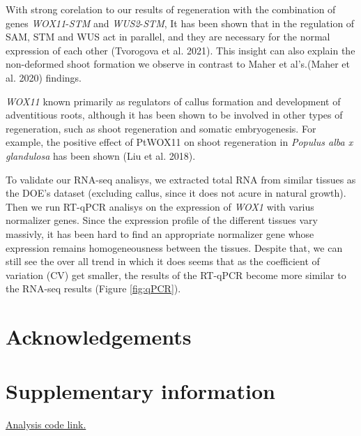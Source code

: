 \documentclass[
]{article}
\begin{document}
With strong corelation to our results of regeneration with the
combination of genes \emph{WOX11}-\emph{STM} and \emph{WUS2}-\emph{STM},
It has been shown that in the regulation of SAM, STM and WUS act in
parallel, and they are necessary for the normal expression of each other
(Tvorogova et al. 2021). This insight can also explain the non-deformed
shoot formation we observe in contrast to Maher et al's.(Maher et al.
2020) findings.

\emph{WOX11} known primarily as regulators of callus formation and
development of adventitious roots, although it has been shown to be
involved in other types of regeneration, such as shoot regeneration and
somatic embryogenesis. For example, the positive effect of PtWOX11 on
shoot regeneration in \emph{Populus alba x glandulosa} has been shown
(Liu et al. 2018).

To validate our RNA-seq analisys, we extracted total RNA from similar
tissues as the DOE's dataset (excluding callus, since it does not acure
in natural growth). Then we run RT-qPCR analisys on the expression of
\emph{WOX1} with varius normalizer genes. Since the expression profile
of the different tissues vary massivly, it has been hard to find an
appropriate normalizer gene whose expression remains homogeneousness
between the tissues. Despite that, we can still see the over all trend
in which it does seems that as the coefficient of variation (CV) get
smaller, the results of the RT-qPCR become more similar to the RNA-seq
results (Figure \ref{fig:qPCR}).

\hypertarget{acknowledgements}{%
\section{Acknowledgements}\label{acknowledgements}}

\hypertarget{supplementary-information}{%
\section{Supplementary information}\label{supplementary-information}}

\href{https://htmlpreview.github.io/?https://raw.githubusercontent.com/BenSiv/PopAT-expression-analysis/main/PopAT_Expression.html}{Analysis
code link.}
\end{document}
